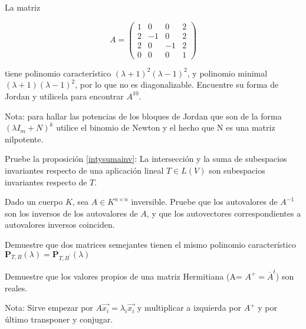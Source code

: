 \begin{exercise} 
\item
La matriz

\bigskip

\[A=\left(\begin{array}{cccc}1 & 0 & 0 &2  \\ 2& -1 & 0
& 2\\ 2  & 0 & -1 &  2\\0 & 0 & 0 & 1                         
\end{array}
 \right)
\]

\bigskip

\noindent  tiene polinomio característico $(\lambda+1)^2(\lambda-1)^2$, y polinomio minimal $(\lambda+1)(\lambda-1)^2$, por lo que no es diagonalizable.
Encuentre su forma de Jordan y utilicela para encontrar $A^{10}$.

\bigskip


\noindent Nota: para hallar las potencias de los bloques de Jordan que son de la forma $(\lambda I_m +N)^k$ utilice el binomio de Newton y el hecho que N es una matriz nilpotente.

\end{exercise} 

 
\bigskip

\begin{exercise} 
\item

 Pruebe la proposición \ref{intysumainv}:
\noindent
La intersección y la suma de subespacios invariantes respecto de una aplicación lineal $T\in L(V)$ son subespacios invariantes respecto de $T$.

\end{exercise} 
\begin{exercise} 
\item

Dado un cuerpo $K$, sea $A \in K^{n\times n}$ inversible. Pruebe que los autovalores de $A^{-1}$ son los inversos de los autovalores de $A$, y que los autovectores correspondientes a autovalores inversos coinciden.
\end{exercise} 

\begin{exercise} 
\item
Demuestre que  dos matrices semejantes tienen  el mismo polinomio característico
$\mathbf{P}_{T,B}(\lambda)=\mathbf{P}_{T,B^{\prime}}(\lambda)$
\end{exercise} 
\begin{exercise} 
\item
Demuestre que los valores propios de una matriz Hermitiana (A= $A^{+}=\overline A ^t$) son reales.

\bigskip

Nota: Sirve empezar
por $A\vec{x_i}=\lambda_i \vec{x_i}$ y multiplicar a izquierda por $A^{+}$ y por último transponer y conjugar. 
\end{exercise} 

